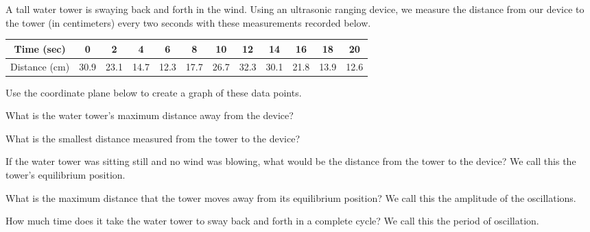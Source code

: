 \begin{pa} \label{PA:0.5}
A tall water tower is swaying back and forth in the wind.  Using an ultrasonic ranging
device, we measure the distance from our device to the tower (in centimeters) every two
seconds with these measurements recorded below.  

\medskip

\begin{tabular}{| c | c | c | c | c | c | c | c | c | c | c | c |}
\hline
Time (sec) & 0 & 2 & 4 & 6 & 8 & 10 & 12 & 14 & 16 & 18 & 20 \\
\hline
Distance (cm) & 30.9 & 23.1 & 14.7 & 12.3 & 17.7 & 26.7 & 32.3 & 30.1 & 21.8 & 13.9 & 12.6 \\
\hline
\end{tabular}

\ba
\item Use the coordinate plane below to create a graph of these data points.
    \begin{center}
    \end{center}
\item What is the water tower's maximum distance away from the device? %
\item What is the smallest distance measured from the tower to the device? %
\item If the water tower was sitting still and no wind was blowing, what would be the distance from the tower to the device?  We call this the tower's equilibrium position.%
\item What is the maximum distance that the tower moves away from its equilibrium position?  We call this the amplitude of the oscillations.  %
\item How much time does it take the water tower to sway back and forth in a complete cycle?  We call this the period of oscillation.  %



\ea
\end{pa} \afterpa
